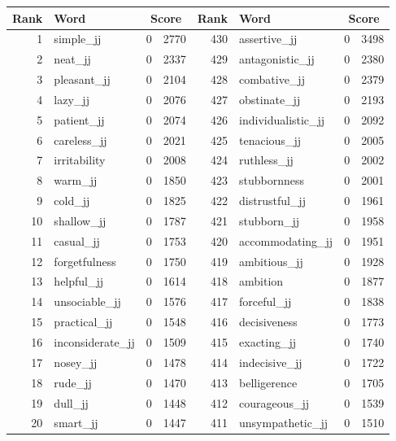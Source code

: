 \begin{table}[tbp]
    \begin{tabular}{| rlr@{.}l | rlr@{.}l |}
    \hline
    \textbf{Rank} & \textbf{Word} & \multicolumn{2}{c|}{\textbf{Score}} & \textbf{Rank} & \textbf{Word} & \multicolumn{2}{c|}{\textbf{Score}} \\
    \hline
    1 & simple\_jj & 0 & 2770    &    430 & assertive\_jj & 0 & 3498 \\
    2 & neat\_jj & 0 & 2337    &    429 & antagonistic\_jj & 0 & 2380 \\
    3 & pleasant\_jj & 0 & 2104    &    428 & combative\_jj & 0 & 2379 \\
    4 & lazy\_jj & 0 & 2076    &    427 & obstinate\_jj & 0 & 2193 \\
    5 & patient\_jj & 0 & 2074    &    426 & individualistic\_jj & 0 & 2092 \\
    6 & careless\_jj & 0 & 2021    &    425 & tenacious\_jj & 0 & 2005 \\
    7 & irritability & 0 & 2008    &    424 & ruthless\_jj & 0 & 2002 \\
    8 & warm\_jj & 0 & 1850    &    423 & stubbornness & 0 & 2001 \\
    9 & cold\_jj & 0 & 1825    &    422 & distrustful\_jj & 0 & 1961 \\
    10 & shallow\_jj & 0 & 1787    &    421 & stubborn\_jj & 0 & 1958 \\
    11 & casual\_jj & 0 & 1753    &    420 & accommodating\_jj & 0 & 1951 \\
    12 & forgetfulness & 0 & 1750    &    419 & ambitious\_jj & 0 & 1928 \\
    13 & helpful\_jj & 0 & 1614    &    418 & ambition & 0 & 1877 \\
    14 & unsociable\_jj & 0 & 1576    &    417 & forceful\_jj & 0 & 1838 \\
    15 & practical\_jj & 0 & 1548    &    416 & decisiveness & 0 & 1773 \\
    16 & inconsiderate\_jj & 0 & 1509    &    415 & exacting\_jj & 0 & 1740 \\
    17 & nosey\_jj & 0 & 1478    &    414 & indecisive\_jj & 0 & 1722 \\
    18 & rude\_jj & 0 & 1470    &    413 & belligerence & 0 & 1705 \\
    19 & dull\_jj & 0 & 1448    &    412 & courageous\_jj & 0 & 1539 \\
    20 & smart\_jj & 0 & 1447    &    411 & unsympathetic\_jj & 0 & 1510 \\

\end{tabular}
\end{table}
